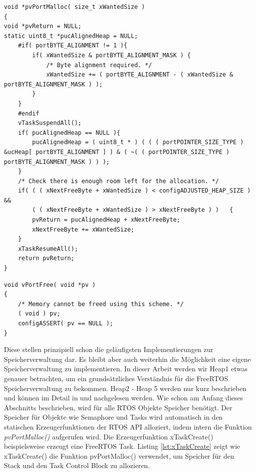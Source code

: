 \begin{lstlisting}[caption={FreeRTOS Source von pvPortMalloc() aus Heap1.c. Zuerst wird sichergestellt, dass die Startspeicheradresse dem byte-Alignment des $\mu$\-Pro\-zesso\-rs entspricht. Der STM32F4 ist ein 32Bit $\mu$\-Pro\-zesso\-r und hat ein byte-Alignment von 4, sodass die Startadresse immer eine Potenz von 4 sein muss. Danach wird der Scheduler deaktiviert und geprüft, ob genug Speicher zur Verfügung steht. Abschließend wird der Speicher im ucHeap reserviert.  }, linewidth=8cm,captionpos=b, label=lst:malloc2, float=htb]
void *pvPortMalloc( size_t xWantedSize )
{
void *pvReturn = NULL;
static uint8_t *pucAlignedHeap = NULL;
	#if( portBYTE_ALIGNMENT != 1 ){
		if( xWantedSize & portBYTE_ALIGNMENT_MASK )	{
			/* Byte alignment required. */
			xWantedSize += ( portBYTE_ALIGNMENT - ( xWantedSize & portBYTE_ALIGNMENT_MASK ) );
		}
	}
	#endif
	vTaskSuspendAll();
	if( pucAlignedHeap == NULL ){
		pucAlignedHeap = ( uint8_t * ) ( ( ( portPOINTER_SIZE_TYPE ) &ucHeap[ portBYTE_ALIGNMENT ] ) & ( ~( ( portPOINTER_SIZE_TYPE ) portBYTE_ALIGNMENT_MASK ) ) );
	}
	/* Check there is enough room left for the allocation. */
	if( ( ( xNextFreeByte + xWantedSize ) < configADJUSTED_HEAP_SIZE ) &&
		( ( xNextFreeByte + xWantedSize ) > xNextFreeByte )	)	{
		pvReturn = pucAlignedHeap + xNextFreeByte;
		xNextFreeByte += xWantedSize;
	}
	xTaskResumeAll();
	return pvReturn;
}
\end{lstlisting}
\begin{lstlisting}[caption={FreeRTOS Source von vPortFree() aus Heap1.c . Da eine Speicherfreigabe in Heap1 nicht vorgesehen ist, ist diese Funktion leer.}, linewidth=8cm,captionpos=b, label=lst:free2, float=htb]
void vPortFree( void *pv )
{
	/* Memory cannot be freed using this scheme. */
	( void ) pv;
	configASSERT( pv == NULL );
}
\end{lstlisting} 
Diese stellen prinzipiell schon die ge\-läu\-figsten Implementierungen zur Speicherverwaltung dar. Es bleibt aber auch weiterhin die Möglichkeit eine eigene Speicherverwaltung zu implementieren. In dieser Arbeit werden wir Heap1 etwas genauer betrachten, um ein grund\-sätz\-liches Verständnis für die FreeRTOS Speicherverwaltung zu bekommen. Heap2 - Heap 5 werden nur kurz beschrieben und können im Detail in \cite{MasteringFreeRtos} und \cite{FreeRtosAdvanced} nachgelesen werden. Wie schon am Anfang dieses Abschnitts beschrieben, wird für alle RTOS Objekte Speicher benötigt. Der Speicher für Objekte wie Semaphore und Tasks wird automatisch in den statischen Erzeugerfunktionen der RTOS API alloziert, indem intern die Funktion \textit{pvPortMalloc()} aufgerufen wird. Die Erzeugerfunktion xTaskCreate() beispielsweise erzeugt eine FreeRTOS Task. Listing \ref{lst:xTaskCreate} zeigt wie xTaskCreate() die Funktion pvPortMalloc() verwendet, um Speicher für den Stack und den Task Control Block zu allozieren.
